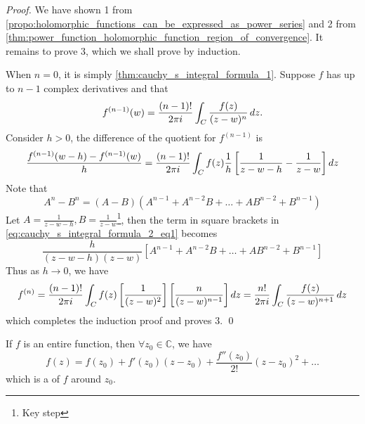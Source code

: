 \documentclass[11pt, oneside]{book}
\begin{document}
\begin{proof}
	We have shown 1 from \cref{propo:holomorphic_functions_can_be_expressed_as_power_series} and 2 from \cref{thm:power_function_holomorphic_function_region_of_convergence}. It remains to prove 3, which we shall prove by induction.

	When $n = 0$, it is simply \cref{thm:cauchy_s_integral_formula_1}. Suppose $f$ has up to $n - 1$ complex derivatives and that
	\begin{equation*}
		f^{(n - 1)} (w) = \frac{(n - 1)!}{2 \pi i} \int_{C} \frac{f(z)}{(z - w)^n} \mathop{}\!d{z} .
	\end{equation*}
	Consider $h > 0$, the difference of the quotient for $f^{(n - 1)}$ is
	\begin{equation}\label{eq:cauchy_s_integral_formula_2_eq1}
		\frac{f^{(n-1)} (w - h) - f^{(n - 1)}(w)}{h} = \frac{(n-1)!}{2 \pi i} \int_{C} f(z) \frac{1}{h} \left[ \frac{1}{z - w - h} - \frac{1}{z - w} \right] \mathop{}\!d{z} 
	\end{equation}
	Note that
	\begin{equation*}
		A^n - B^n = (A - B)(A^{n-1} + A^{n - 2}B + \hdots + AB^{n - 2} + B^{n - 1})
	\end{equation*}
	Let $A = \frac{1}{z - w -h}, B = \frac{1}{z - w}$\footnote{Key step}, then the term in square brackets in \cref{eq:cauchy_s_integral_formula_2_eq1} becomes
	\begin{equation*}
		\frac{h}{(z - w - h)(z - w)} \left[A^{n - 1} + A^{n - 2}B + \hdots + AB^{n - 2} + B^{n - 1}\right]
	\end{equation*}
	Thus as $h \to 0$, we have
	\begin{equation*}
		f^{(n)} = \frac{(n - 1)!}{2 \pi i} \int_{C} f(z) \left[\frac{1}{(z - w)^2} \right] \left[ \frac{n}{(z - w)^{n - 1}} \right] \mathop{}\!d{z} = \frac{n!}{2 \pi i} \int_{C} \frac{f(z)}{(z - w)^{n + 1}} \mathop{}\!d{z}
	\end{equation*}
	which completes the induction proof and proves 3. \qed
\end{proof}

\begin{crly}\label{crly:taylor_expansion_of_entire_functions}
	If $f$ is an entire function, then $\forall z_0 \in \mathbb{C}$, we have
	\begin{equation*}
		f(z) = f(z_0) + f'(z_0)(z - z_0) + \frac{f''(z_0)}{2!} (z - z_0)^2 + \hdots
	\end{equation*}
	which is a  of $f$ around $z_0$.
\end{crly}
\end{document}
